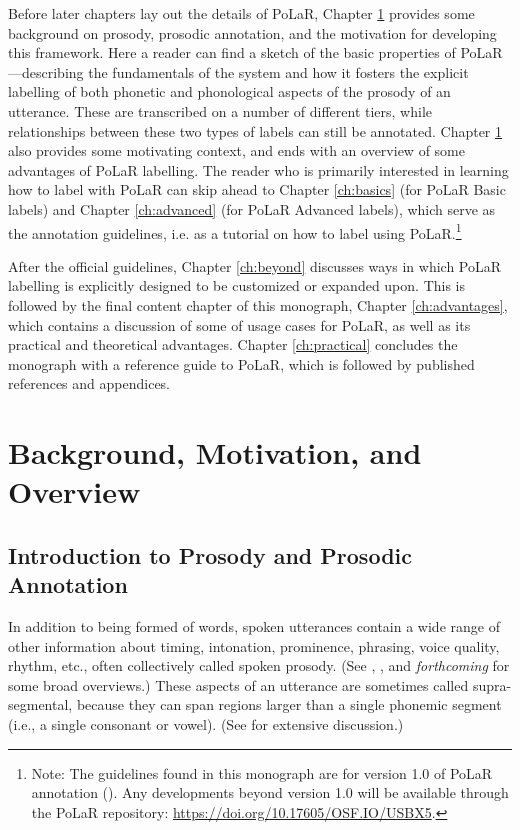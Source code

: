 \documentclass[11pt, twoside]{memoir}
\begin{document}
Before later chapters lay out the details of PoLaR, Chapter \ref{ch:background} provides some background on prosody, prosodic annotation, and the motivation for developing this framework. Here a reader can find a sketch of the basic properties of PoLaR —describing the fundamentals of the system and how it fosters the explicit labelling of both phonetic and phonological aspects of the prosody of an utterance.  These are transcribed on a number of different tiers, while relationships between these two types of labels can still be annotated. Chapter \ref{ch:background} also provides some motivating context, and ends with an overview of some advantages of PoLaR labelling. The reader who is primarily interested in learning how to label with PoLaR can skip ahead to Chapter \ref{ch:basics} (for PoLaR Basic labels) and Chapter \ref{ch:advanced} (for PoLaR Advanced labels), which serve as the annotation guidelines, i.e. as a tutorial on how to label using PoLaR.\footnote{Note: The guidelines found in this monograph are for version 1.0 of PoLaR annotation (\citealt{ahn-21}). Any developments beyond version 1.0 will be available through the PoLaR repository: \href{https://doi.org/10.17605/OSF.IO/USBX5}{https://doi.org/10.17605/OSF.IO/USBX5}.}

After the official guidelines, Chapter \ref{ch:beyond} discusses ways in which PoLaR labelling is explicitly designed to be customized or expanded upon. This is followed by the final content chapter of this monograph, Chapter \ref{ch:advantages}, which contains a discussion of some of usage cases for PoLaR, as well as its practical and theoretical advantages. Chapter \ref{ch:practical} concludes the monograph with a reference guide to PoLaR, which is followed by published references and appendices.

\renewcommand*{\thefootnote}{\arabic{footnote}}



\chapter{Background, Motivation, and Overview}\label{ch:background}

\section{Introduction to Prosody and Prosodic Annotation}\label{sec:introduction-to-prosody-and-prosodic-annotation}

In addition to being formed of words, spoken utterances contain a wide range of other information about timing, intonation, prominence, phrasing, voice quality, rhythm, etc., often collectively called spoken prosody. (See \citealt{ladd08}, \citealt{beckmanvenditti11}, and \citeauthor{barnesshattuckhufnagel20} \textit{forthcoming} for some broad overviews.) These aspects of an utterance are sometimes called supra-segmental, because they can span regions larger than a single phonemic segment (i.e., a single consonant or vowel). (See \citealt{lehiste70} for extensive discussion.)
\end{document}
